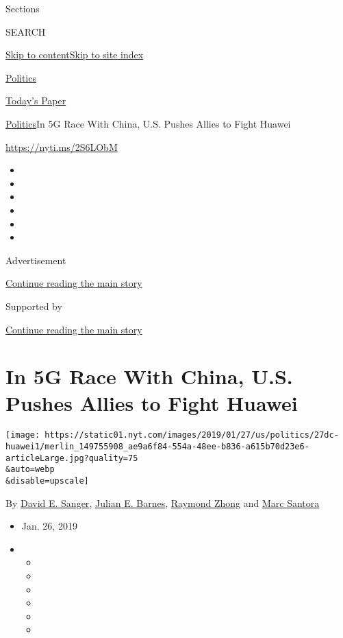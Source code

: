 Sections

SEARCH

\protect\hyperlink{site-content}{Skip to
content}\protect\hyperlink{site-index}{Skip to site index}

\href{https://www.nytimes.com/section/politics}{Politics}

\href{https://myaccount.nytimes.com/auth/login?response_type=cookie\&client_id=vi}{}

\href{https://www.nytimes.com/section/todayspaper}{Today's Paper}

\href{/section/politics}{Politics}\textbar{}In 5G Race With China, U.S.
Pushes Allies to Fight Huawei

\url{https://nyti.ms/2S6LObM}

\begin{itemize}
\item
\item
\item
\item
\item
\item
\end{itemize}

Advertisement

\protect\hyperlink{after-top}{Continue reading the main story}

Supported by

\protect\hyperlink{after-sponsor}{Continue reading the main story}

\hypertarget{in-5g-race-with-china-us-pushes-allies-to-fight-huawei}{%
\section{In 5G Race With China, U.S. Pushes Allies to Fight
Huawei}\label{in-5g-race-with-china-us-pushes-allies-to-fight-huawei}}

\texttt{[image: https://static01.nyt.com/images/2019/01/27/us/politics/27dc-huawei1/merlin\_149755908\_ae9a6f84-554a-48ee-b836-a615b70d23e6-articleLarge.jpg?quality=75\\\&auto=webp\\\&disable=upscale]}

By \href{https://www.nytimes.com/by/david-e-sanger}{David E. Sanger},
\href{https://www.nytimes.com/by/julian-e-barnes}{Julian E. Barnes},
\href{https://www.nytimes.com/by/raymond-zhong}{Raymond Zhong} and
\href{https://www.nytimes.com/by/marc-santora}{Marc Santora}

\begin{itemize}
\item
  Jan. 26, 2019
\item
  \begin{itemize}
  \item
  \item
  \item
  \item
  \item
  \item
  \end{itemize}
\end{itemize}

